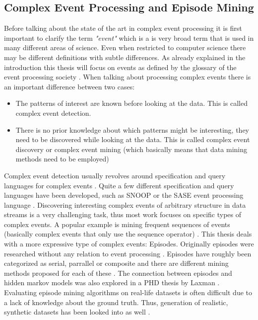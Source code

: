 \subsection{Complex Event Processing and Episode Mining}
\label{subsec_eventProcessing}
Before talking about the state of the art in complex event processing it is first important to clarify the term \textit{"event"} which is a is very broad term that is used in many different areas of science. Even when restricted to computer science there may be different definitions with subtle differences. As already explained in the introduction this thesis will focus on events as defined by the glossary of the event processing society \cite{luckham2011epts}.
When talking about processing complex events there is an important difference between two cases:

\begin{itemize}
	\item The patterns of interest are known before looking at the data. This is called complex event detection.
	\item There is no prior knowledge about which patterns might be interesting, they need to be discovered while looking at the data. This is called complex event discovery or complex event mining (which basically means that data mining methods need to be employed)
\end{itemize}

Complex event detection usually revolves around specification and query languages for complex events \cite{eckert2009complex}. Quite a few different specification and query languages have been developed, such as SNOOP \cite{chakravarthy1994snoop} or the SASE event processing language \cite{wu2006high}. \newline
Discovering interesting complex events of arbitrary structure in data streams is a very challenging task, thus most work focuses on specific types of complex events. A popular example is mining frequent sequences of events (basically complex events that only use the sequence operator) \cite{bettini1998mining} \cite{hasan2015probabilistic}. \newline
This thesis deals with a more expressive type of complex events: Episodes. Originally episodes were researched without any relation to event processing \cite{mannila1995discovering}. 
Episodes have roughly been categorized as serial, parrallel or composite and there are different mining methods proposed for each of these \cite{mannila1995discovering} \cite{zhou2010mining}. The connection between episodes and hidden markov models was also explored in a PHD thesis by Laxman \cite{laxman2006discovering}.
Evaluating episode mining algorithms on real-life datasets is often difficult due to a lack of knowledge about the ground truth. Thus, generation of realistic, synthetic datasets has been looked into as well \cite{zimmermann2012generating}.

